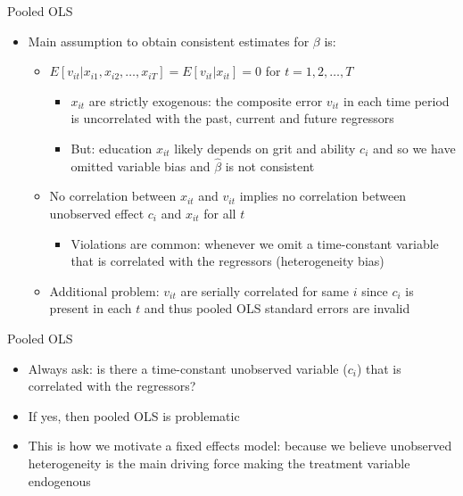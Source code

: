 \documentclass{beamer}
\begin{document}
\begin{frame}{Pooled OLS}
	
	\begin{itemize}
	\item Main assumption to obtain consistent estimates for $\beta$ is:
		\begin{itemize}
		\item $E[v_{it} | x_{i1},x_{i2}, \dots, x_{iT}] = E[v_{it} | x_{it}] = 0$ for $t=1,2,\dots, T$
			\begin{itemize}
			\item $x_{it}$ are strictly exogenous: the composite error $v_{it}$ in each time period is uncorrelated with the past, current and future regressors
			\item But: education $x_{it}$ likely depends on grit and ability $c_i$ and so we have omitted variable bias and $\widehat{\beta}$ is not consistent
			\end{itemize}
		\item No correlation between $x_{it}$ and $v_{it}$ implies no correlation between unobserved effect $c_i$ and $x_{it}$ for all $t$
			\begin{itemize}
			\item Violations are common: whenever we omit a time-constant variable that is correlated with the regressors (heterogeneity bias)
			\end{itemize}
		\item Additional problem: $v_{it}$ are serially correlated for same $i$ since $c_i$ is present in each $t$ and thus pooled OLS standard errors are invalid
		\end{itemize}
	\end{itemize}
\end{frame}

\begin{frame}{Pooled OLS}
	
	\begin{itemize}
	\item Always ask: is there a time-constant unobserved variable ($c_i$) that is correlated with the regressors?  
	\item If yes, then pooled OLS is problematic
	\item This is how we motivate a fixed effects model: because we believe unobserved heterogeneity is the main driving force making the treatment variable endogenous
	\end{itemize}
\end{frame}
\end{document}
